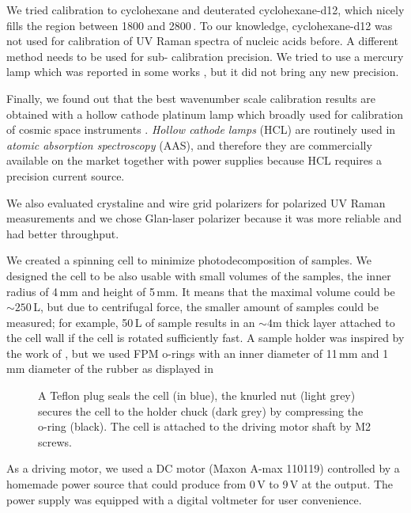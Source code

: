 We tried calibration to cyclohexane and deuterated cyclohexane-d12, which
nicely fills the region between 1800 and 2800\,\icm{}.
To our knowledge, cyclohexane-d12 was not used for calibration of UV Raman
spectra of nucleic acids before.
A different method needs to be used for sub-\icm{} calibration precision.
We tried to use a mercury lamp which was reported in some works
\textcite{Manoharan1990},
but it did not bring any new precision.

Finally, we found out that the best wavenumber scale calibration results are
obtained with a hollow cathode platinum lamp which broadly used for calibration
of cosmic space instruments
\parencite{%
	Mount1977,%
	Reader1990,%
	Sansonetti1992%
}.
\emph{Hollow cathode lamps} (HCL) are routinely used in \emph{atomic absorption
spectroscopy} (AAS), and therefore they are commercially available on the
market together with power supplies because HCL requires a precision current
source.

We also evaluated crystaline and wire grid polarizers for polarized UV Raman
measurements and we chose Glan-laser polarizer because it was more reliable
and had better throughput.

We created a spinning cell to minimize photodecomposition of samples.
We designed the cell to be also usable with small volumes of the samples, the
inner radius of 4\,mm and height of 5\,mm.
It means that the maximal volume could be $\sim250$\,L, but due to
centrifugal force, the smaller amount of samples could be measured;
for example, 50\,L of sample results in an $\sim 4$m thick layer
attached to the cell wall if the cell is rotated sufficiently fast.
A sample holder was inspired by the work of
\textcite{Shriver1974},
but we used FPM o-rings with an inner diameter of 11\,mm and 1\,mm diameter of
the rubber as displayed in

\begin{figure}
	\centering
	
	\caption[%
		Spinning cell holder.%
	]{%
		A Teflon plug seals the cell (in blue), the knurled nut (light grey)
		secures the cell to the holder chuck (dark grey) by compressing the o-ring
		(black).
		The cell is attached to the driving motor shaft by M2 screws.
	}
	\label{\figlabel{spinning_cell:drawing}}
\end{figure}

As a driving motor, we used a DC motor (Maxon A-max 110119) controlled by a
homemade power source that could produce from 0\,V to 9\,V at the output.
The power supply was equipped with a digital voltmeter for user convenience.

